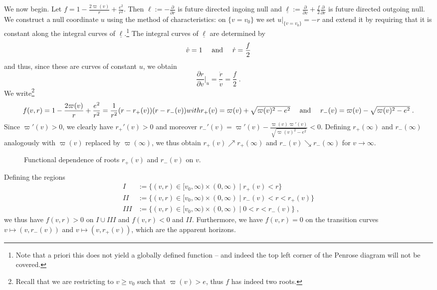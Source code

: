\documentclass[reqno]{article}
\newcommand{\rd}{\partial}
\begin{document}
We now begin. Let $f = 1 - \frac{2 \varpi(v)}{r} + \frac{e^2}{r^2}$. Then $\ell := - \frac{\rd}{\rd r}$ is future directed ingoing null and $\underline{\ell}:= \frac{\rd}{\rd v} + \frac{f}{2} \frac{\rd}{\rd r}$ is future directed outgoing null. We construct a null coordinate $u$ using the method of characteristics: on $\{v = v_0\}$ we set $u|_{\{v = v_0\}} = -r$ and extend it by requiring that it is constant along the integral curves of $\underline{\ell}$.\footnote{Note that a priori this does not yield a globally defined function -- and indeed the top left corner of the Penrose diagram will not be covered.} The integral curves of $\underline{\ell}$ are determined by \begin{equation} 
\label{EqEqIntegralCurves}
\dot{v} = 1 \quad \textnormal{ and } \quad \dot{r} = \frac{f}{2}\end{equation}
 and thus, since these are curves of constant $u$, we obtain
\begin{equation}
\label{EqVROnConstantU}
\frac{\partial r}{\partial v}\Big|_u = \frac{\dot{r}}{\dot{v}} = \frac{f}{2} \;.
\end{equation}
We write\footnote{Recall that we are restricting to $v \geq v_0$ such that $\varpi(v) > e$, thus $f$ has indeed two roots.} \begin{equation}
\label{EqFTwoDef}
f(v,r) = 1 - \frac{2\varpi(v)}{r} + \frac{e^2}{r^2} = \frac{1}{r^2}( r - r_+(v))(r - r_-(v))$$ with $$r_+(v) = \varpi(v) + \sqrt{\varpi(v)^2 - e^2} \quad \textnormal{ and } \quad r_-(v) = \varpi(v) - \sqrt{\varpi(v)^2 - e^2} \;.
\end{equation} 
Since $\varpi'(v) > 0$, we clearly have $r_+'(v) >0$ and moreover $r_-'(v) = \varpi'(v) - \frac{\varpi(v) \varpi'(v)}{\sqrt{\varpi(v)^2 - e^2}} < 0$. Defining $r_+(\infty)$ and $r_-(\infty)$ analogously with $\varpi(v)$ replaced by $\varpi(\infty)$, we thus obtain $r_+(v) \nearrow r_+(\infty)$ and $r_-(v) \searrow r_-(\infty)$ for $v \to \infty$.
\begin{figure}[h]
\centering
 \def\svgwidth{6cm}
   
      \caption{Functional dependence of roots $r_+(v)$ and $r_-(v)$ on $v$.} \label{FigRV}
\end{figure}
Defining the regions
\begin{equation*}
\begin{aligned}
I&:= \{ (v,r) \in [v_0, \infty) \times (0, \infty) \; | \; r_+(v) < r\} \\
II&:=\{ (v,r) \in [v_0, \infty) \times (0, \infty) \; | \; r_-(v) < r< r_+(v) \} \\
III &:= \{ (v,r) \in [v_0, \infty) \times (0, \infty) \; | \; 0 < r<r_-(v) \} \;,
\end{aligned}
\end{equation*}
we thus have $f(v,r) >0$ on $I \cup III$ and $f(v,r) <0$ and $II$. Furthermore, we have $f(v,r) = 0$ on the transition curves $v \mapsto (v, r_-(v))$ and $v \mapsto (v, r_+(v))$, which are the apparent horizons.
\end{document}
